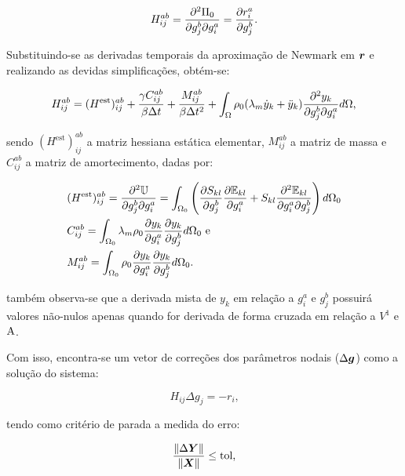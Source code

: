 \begin{equation}
    H_{ij}^{ab}=\frac{\partial^2\Pi_0}{\partial g_j^b\partial g_i^a}=\frac{\partial{r_i^a}}{\partial{g_j^b}}\text{.}
\end{equation}

Substituindo-se as derivadas temporais da aproximação de Newmark em $\boldsymbol{r}$ e realizando as devidas simplificações, obtém-se:

\begin{equation}
    H_{ij}^{ab}=(H^\text{est})_{ij}^{ab}+\frac{\gamma C_{ij}^{ab}}{\beta\Delta t}+\frac{M_{ij}^{ab}}{\beta\Delta t^2}+\int_{\Omega}{\rho_0(\lambda_m\dot{y}_k+\ddot{y}_k)\frac{\partial^2{y_k}}{\partial{g_j^b}\partial{g_i^a}} d\Omega}\text{,}
    \label{eq:CSD-Hijab}
\end{equation}

\noindent sendo $(H^\text{est})_{ij}^{ab}$ a matriz hessiana estática elementar, $M_{ij}^{ab}$ a matriz de massa e $C_{ij}^{ab}$ a matriz de amortecimento, dadas por:

\begin{subequations}
    \begin{align}
         & (H^\text{est})_{ij}^{ab}=\frac{\partial^2{\mathbb{U}}}{\partial{g_j^b}\partial{g_i^a}}=\int_{\Omega_0}{\left({\frac{\partial{S_{kl}}}{\partial{g_j^b}}\frac{\partial{\mathbb{E}_{kl}}}{\partial{g_i^a}}+S_{kl}\frac{\partial^2{\mathbb{E}_{kl}}}{\partial{g_i^a}\partial{g_j^b}}}\right) d\Omega_0} \\
         & C_{ij}^{ab}=\int_{\Omega_0}{\lambda_m\rho_0\frac{\partial{y_k}}{\partial{g_i^a}}\frac{\partial{y_k}}{\partial{g_j^b}} d\Omega_0}\text{ e}                                                                                         \\
         & M_{ij}^{ab}=\int_{\Omega_0}{\rho_0\frac{\partial{y_k}}{\partial{g_i^a}}\frac{\partial{y_k}}{\partial{g_j^b}} d\Omega_0}\text{.}
    \end{align}
    \label{eq:CSD-HMC}
\end{subequations}

\noindent também observa-se que a derivada mista de $y_k$ em relação a $g_i^a$ e $g_j^b$ possuirá valores não-nulos apenas quando for derivada de forma cruzada em relação a $V^1$ e $\mathrm{A}$.

Com isso, encontra-se um vetor de correções dos parâmetros nodais ($\Delta\boldsymbol{g}$) como a solução do sistema:

\begin{equation}
    H_{ij}\Delta g_j=-r_i\text{,}
\end{equation}

\noindent tendo como critério de parada a medida do erro:

\begin{equation}
    \frac{\left\lVert{\Delta\boldsymbol{Y}}\right\lVert}{\left\lVert{\boldsymbol{X}}\right\lVert}\leq\text{tol,}
    \label{eq:CSD-erro}
\end{equation}


